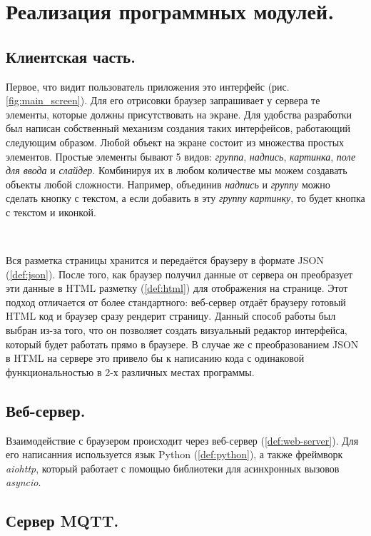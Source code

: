 \clearpage

\section{Реализация программных модулей.}

\subsection{Клиентская часть.}

Первое, что видит пользователь приложения это интерфейс (рис. \ref{fig:main_screen}). Для его отрисовки браузер запрашивает
у сервера те элементы, которые должны присутствовать на экране. Для удобства разработки был написан собственный механизм
создания таких интерфейсов, работающий следующим образом. Любой объект на экране состоит из множества простых элементов.
Простые элементы бывают 5 видов: \textit{группа}, \textit{надпись}, \textit{картинка}, \textit{поле для ввода} и
\textit{слайдер}. Комбинируя их в любом количестве мы можем создавать объекты любой сложности. Например, объединив
\textit{надпись} и \textit{группу} можно сделать кнопку с текстом, а если добавить в эту \textit{группу} \textit{картинку},
то будет кнопка с текстом и иконкой.

~\

\noindent Вся разметка страницы хранится и передаётся браузеру в формате JSON (\ref{def:json}). После того, как браузер
получил данные от сервера он преобразует эти данные в HTML разметку (\ref{def:html}) для отображения на странице. Этот подход
отличается от более стандартного: веб-сервер отдаёт браузеру готовый HTML код и браузер сразу рендерит страницу.
Данный способ работы был выбран из-за того, что он позволяет создать визуальный редактор интерфейса, который будет работать
прямо в браузере. В случае же с преобразованием JSON в HTML на сервере это привело бы к написанию кода с одинаковой
функциональностью в 2-х различных местах программы.

\subsection{Веб-сервер.}

Взаимодействие с браузером происходит через веб-сервер (\ref{def:web-server}). Для его написанния используется язык
Python (\ref{def:python}), а также фреймворк \textit{aiohttp}, который работает с помощью библиотеки для асинхронных вызовов
\textit{asyncio}.

\subsection{Сервер MQTT.}

